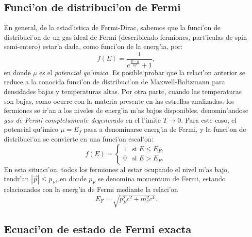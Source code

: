 \subsection{Funci'on de distribuci'on de Fermi}
En general, de la estad'istica de Fermi-Dirac, sabemos que la funci'on de distribuci'on de un gas ideal de Fermi (describiendo fermiones, part'iculas de spin semi-entero) estar'a dada, como funci'on de la energ'ia, por:
\begin{equation}
 f(E)=\frac{1}{e^{\frac{E-\mu}{kT}}+1},
\end{equation}
en donde $\mu$ es el \textit{potencial qu'imico}. Es posible probar que la relaci'on anterior se reduce a la conocida funci'on de distribuci'on de Maxwell-Boltzmann para densidades bajas y temperaturas altas. Por otra parte, cuando las temperaturas son bajas, como ocurre con la materia presente en las estrellas analizadas, los fermiones se ir'an a los niveles de energ'ia m'as bajos disponibles, denomin'andose \textit{gas de Fermi completamente degenerado} en el l'imite $T\to 0$. Para este caso, el potencial qu'imico $\mu=E_f$ pasa a denominarse energ'ia de Fermi, y la funci'on de distribuci'on se convierte en una funci'on escal'on:
\begin{equation}\label{fermidegenerada}
f(E)=\begin{cases}
   1& \text{si } E \leq E_F ,\\
   0& \text{si } E > E_F.
  \end{cases}
\end{equation}
En esta situaci'on, todos los fermiones al estar ocupando el nivel m'as bajo, tendr'an $\left|\vec{p}\right|\le p_F$, en donde $p_F$ se denomina momentum de Fermi, estando relacionados con la energ'ia de Fermi mediante la relaci'on
\begin{equation}\label{energiafermi}
E_F=\sqrt{p_F^2 c^2+m_e^2 c^4}.
\end{equation}

\subsection{Ecuaci'on de estado de Fermi exacta}

